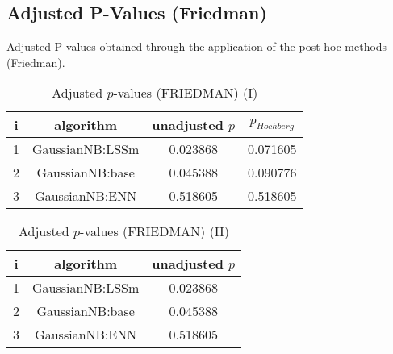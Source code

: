 \documentclass[a4paper,10pt]{article}
\begin{document}
\begin{landscape}
\section{Adjusted P-Values (Friedman)}


Adjusted P-values obtained through the application of the post hoc methods (Friedman).

\begin{table}[!htp]
\centering\small
\begin{tabular}{cccc}
i&algorithm&unadjusted $p$&$p_{Hochberg}$\\
\hline1&GaussianNB:LSSm&0.023868&0.071605\\2&GaussianNB:base&0.045388&0.090776\\3&GaussianNB:ENN&0.518605&0.518605\\\hline
\end{tabular}
\caption{Adjusted $p$-values (FRIEDMAN) (I)}
\end{table}
\begin{table}[!htp]
\centering\small
\begin{tabular}{ccc}
i&algorithm&unadjusted $p$\\
\hline1&GaussianNB:LSSm&0.023868\\2&GaussianNB:base&0.045388\\3&GaussianNB:ENN&0.518605\\\hline
\end{tabular}
\caption{Adjusted $p$-values (FRIEDMAN) (II)}
\end{table}

\newpage
\end{landscape}
\end{document}
